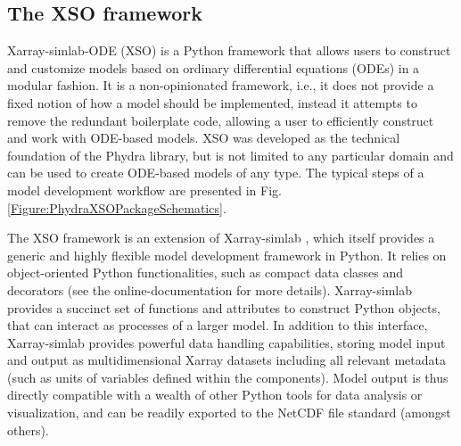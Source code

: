 \documentclass[gmd, manuscript]{copernicus}
\begin{document}

\subsection{The XSO framework} \label{Section:XSOFramework}

Xarray-simlab-ODE (XSO) is a Python framework that allows users to construct and customize models based on ordinary differential equations (ODEs) in a modular fashion. It is a non-opinionated framework, i.e., it does not provide a fixed notion of how a model should be implemented, instead it attempts to remove the redundant boilerplate code, allowing a user to efficiently construct and work with ODE-based models. XSO was developed as the technical foundation of the Phydra library, but is not limited to any particular domain and can be used to create ODE-based models of any type. The typical steps of a model development workflow are presented in Fig. \ref{Figure:PhydraXSOPackageSchematics}.

The XSO framework is an extension of Xarray-simlab \citep{Bovy2018Xarray-simlab:Interactively, Bovy2021Benbovy/xarray-simlab:0.5.0}, which itself provides a generic and highly flexible model development framework in Python. It relies on object-oriented Python functionalities, such as compact data classes and decorators (see the online-documentation for more details). Xarray-simlab provides a succinct set of functions and attributes to construct Python objects, that can interact as processes of a larger model. In addition to this interface, Xarray-simlab provides powerful data handling capabilities, storing model input and output as multidimensional Xarray datasets \citep{Hoyer2017Xarray:Python} including all relevant metadata (such as units of variables defined within the components). Model output is thus directly compatible with a wealth of other Python tools for data analysis or visualization, and can be readily exported to the NetCDF file standard (amongst others). 
\end{document}
